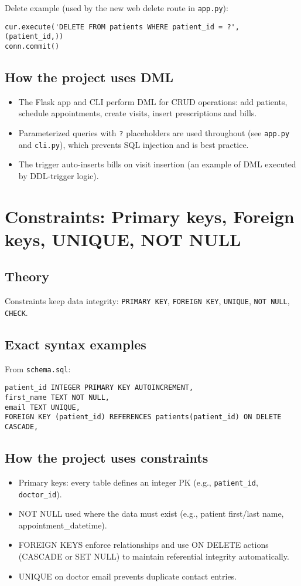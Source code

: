 \documentclass[11pt,a4paper]{article}
\begin{document}
Delete example (used by the new web delete route in \texttt{app.py}):
\begin{lstlisting}
cur.execute('DELETE FROM patients WHERE patient_id = ?', (patient_id,))
conn.commit()
\end{lstlisting}

\subsection{How the project uses DML}
\begin{itemize}
  \item The Flask app and CLI perform DML for CRUD operations: add patients, schedule appointments, create visits, insert prescriptions and bills.
  \item Parameterized queries with \texttt{?} placeholders are used throughout (see \texttt{app.py} and \texttt{cli.py}), which prevents SQL injection and is best practice.
  \item The trigger auto-inserts bills on visit insertion (an example of DML executed by DDL-trigger logic).
\end{itemize}

\section{Constraints: Primary keys, Foreign keys, UNIQUE, NOT NULL}
\subsection{Theory}
Constraints keep data integrity: \texttt{PRIMARY KEY}, \texttt{FOREIGN KEY}, \texttt{UNIQUE}, \texttt{NOT NULL}, \texttt{CHECK}.

\subsection{Exact syntax examples}
From \texttt{schema.sql}:
\begin{lstlisting}
patient_id INTEGER PRIMARY KEY AUTOINCREMENT,
first_name TEXT NOT NULL,
email TEXT UNIQUE,
FOREIGN KEY (patient_id) REFERENCES patients(patient_id) ON DELETE CASCADE,
\end{lstlisting}

\subsection{How the project uses constraints}
\begin{itemize}
  \item Primary keys: every table defines an integer PK (e.g., \texttt{patient_id}, \texttt{doctor_id}).
  \item NOT NULL used where the data must exist (e.g., patient first/last name, appointment_datetime).
  \item FOREIGN KEYS enforce relationships and use ON DELETE actions (CASCADE or SET NULL) to maintain referential integrity automatically.
  \item UNIQUE on doctor email prevents duplicate contact entries.
\end{itemize}
\end{document}
